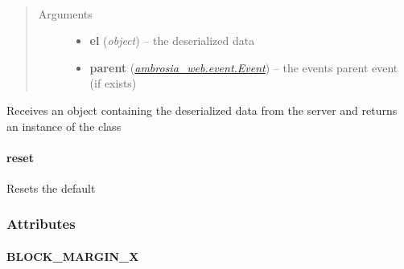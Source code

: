 \documentclass[letterpaper,10pt,english]{sphinxmanual}
\begin{document}
\begin{fulllineitems}
\label{ambrosia_web.event:ambrosia_web.event.enrich}~\begin{quote}\begin{description}
\item[{Arguments}] \leavevmode\begin{itemize}
\item {} 
\textbf{el} (\emph{object}) -- the deserialized data

\item {} 
\textbf{parent} ({\hyperref[ambrosia_web.event.Event:ambrosia_web.event.Event]{\emph{ambrosia\_web.event.Event}}}) -- the events parent event (if exists)

\end{itemize}

\end{description}\end{quote}

\end{fulllineitems}


Receives an object containing the deserialized data from the server and returns an instance of the class
{\hyperref[ambrosia_web.event.Event:ambrosia_web.event.Event]{}}


\paragraph{reset}
\label{ambrosia_web.event:reset}

\begin{fulllineitems}
\label{ambrosia_web.event:ambrosia_web.event.reset}
\end{fulllineitems}


Resets the default 


\subsubsection{Attributes}
\label{ambrosia_web.event:attributes}

\paragraph{BLOCK\_MARGIN\_X}
\label{ambrosia_web.event:block-margin-x}
\end{document}
